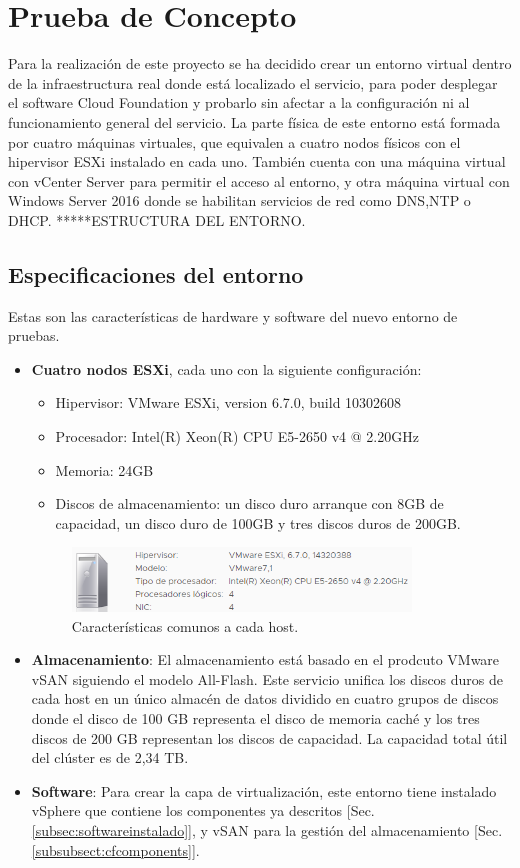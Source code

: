 
\section{Prueba de Concepto}
Para la realización de este proyecto se ha decidido crear un entorno virtual dentro de la infraestructura real donde está localizado el servicio, para poder desplegar el software Cloud Foundation y probarlo sin afectar a la configuración ni al funcionamiento general del servicio. La parte física de este entorno está formada por cuatro máquinas virtuales, que equivalen a cuatro nodos físicos con el hipervisor ESXi instalado en cada uno. También cuenta con una máquina virtual con vCenter Server para permitir el acceso al entorno, y otra máquina virtual con Windows Server 2016 donde se habilitan servicios de red como DNS,NTP o DHCP.
*****ESTRUCTURA DEL ENTORNO.
\subsection{Especificaciones del entorno}
Estas son las características de hardware y software del nuevo entorno de pruebas.
\begin{itemize}
    \item \textbf{Cuatro nodos ESXi}, cada uno con la siguiente configuración:
    \begin{itemize}
        \item Hipervisor: VMware ESXi, version 6.7.0, build 10302608
        \item Procesador: Intel(R) Xeon(R) CPU E5-2650 v4 @ 2.20GHz
        \item Memoria: 24GB
        \item Discos de almacenamiento: un disco duro arranque con 8GB de capacidad, un disco duro de 100GB y tres discos duros de 200GB.
    \end{itemize}
            \begin{figure}[h!]
            \centering
            \includegraphics[width=0.85\textwidth]{imaxes/probaConcepto/caracteristicas_NODO.png}
            \caption{Características comunos a cada host.} 
            \label{fig:caracteristicasNODO}
        \end{figure}
        \FloatBarrier
    \item \textbf{Almacenamiento}: El almacenamiento está basado en el prodcuto VMware vSAN siguiendo el modelo All-Flash. Este servicio unifica los discos duros de cada host en un único almacén de datos dividido en cuatro grupos de discos donde el disco de 100 GB representa el disco de memoria caché y los tres discos de 200 GB representan los discos de capacidad. La capacidad total útil del clúster es de 2,34 TB.
    \item \textbf{Software}: Para crear la capa de virtualización, este entorno tiene instalado vSphere que contiene los componentes ya descritos [Sec.\ref{subsec:softwareinstalado}], y vSAN para la gestión del almacenamiento [Sec. \ref{subsubsect:cfcomponents}].
\end{itemize}

